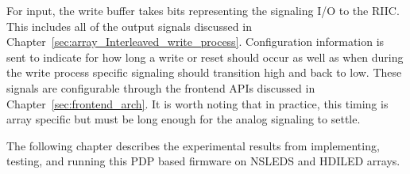     For input, the write buffer takes bits representing the signaling I/O to the RIIC. This includes all of the output signals discussed in Chapter~\ref{sec:array_Interleaved_write_process}. Configuration information is sent to indicate for how long a write or reset should occur as well as when during the write process specific signaling should transition high and back to low. These signals are configurable through the frontend APIs discussed in Chapter~\ref{sec:frontend_arch}. It is worth noting that in practice, this timing is array specific but must be long enough for the analog signaling to settle.

    The following chapter describes the experimental results from implementing, testing, and running this PDP based firmware on NSLEDS and HDILED arrays.

